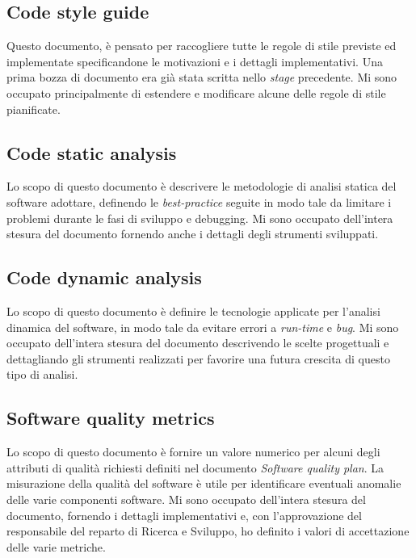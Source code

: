 \subsection{Code style guide}
Questo documento, è pensato per raccogliere tutte le regole di stile previste ed implementate specificandone le motivazioni e i dettagli implementativi. Una prima bozza di documento era già stata scritta nello \textit{stage} precedente. Mi sono occupato principalmente di estendere e modificare alcune delle regole di stile pianificate.

\subsection{Code static analysis}
Lo scopo di questo documento è descrivere le metodologie di analisi statica del software adottare, definendo le \textit{best-practice} seguite in modo tale da limitare i problemi durante le fasi di sviluppo e debugging. Mi sono occupato dell'intera stesura del documento fornendo anche i dettagli degli strumenti sviluppati.

\subsection{Code dynamic analysis}
Lo scopo di questo documento è definire le tecnologie applicate per l'analisi dinamica del software, in modo tale da evitare errori a \textit{run-time} e \textit{bug}. Mi sono occupato dell'intera stesura del documento descrivendo le scelte progettuali e dettagliando gli strumenti realizzati per favorire una futura crescita di questo tipo di analisi.

\subsection{Software quality metrics}
Lo scopo di questo documento è fornire un valore numerico per alcuni degli attributi di qualità richiesti definiti nel documento \textit{Software quality plan}. La misurazione della qualità del software è utile per identificare eventuali anomalie delle varie componenti software. Mi sono occupato dell'intera stesura del documento, fornendo i dettagli implementativi e, con l'approvazione del responsabile del reparto di Ricerca e Sviluppo, ho definito i valori di accettazione delle varie metriche.
